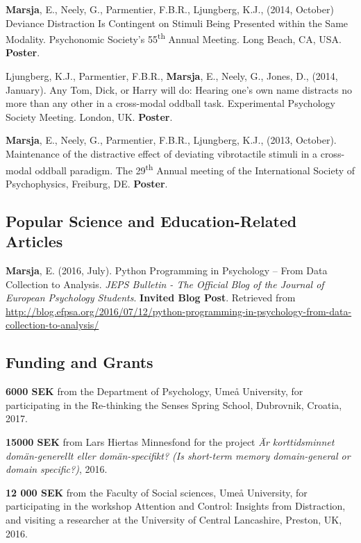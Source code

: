 \documentclass[]{article}
\begin{document}
\textbf{Marsja}, E., Neely, G., Parmentier, F.B.R., Ljungberg, K.J.,
(2014, October) Deviance Distraction Is Contingent on Stimuli Being
Presented within the Same Modality. Psychonomic Society's
55\textsuperscript{th} Annual Meeting. Long Beach, CA, USA.
\textbf{Poster}.

Ljungberg, K.J., Parmentier, F.B.R., \textbf{Marsja}, E., Neely, G.,
Jones, D., (2014, January). Any Tom, Dick, or Harry will do: Hearing
one's own name distracts no more than any other in a cross-modal oddball
task. Experimental Psychology Society Meeting. London, UK.
\textbf{Poster}.

\textbf{Marsja}, E., Neely, G., Parmentier, F.B.R., Ljungberg, K.J.,
(2013, October). Maintenance of the distractive effect of deviating
vibrotactile stimuli in a cross-modal oddball paradigm. The
29\textsuperscript{th} Annual meeting of the International Society of
Psychophysics, Freiburg, DE. \textbf{Poster}.

\subsection{Popular Science and Education-Related
Articles}\label{popular-science-and-education-related-articles}

\textbf{Marsja}, E. (2016, July). Python Programming in Psychology --
From Data Collection to Analysis. \emph{JEPS Bulletin - The Official
Blog of the Journal of European Psychology Students}. \textbf{Invited
Blog Post}. Retrieved from \sloppy
\url{http://blog.efpsa.org/2016/07/12/python-programming-in-psychology-from-data-collection-to-analysis/}

\subsection{Funding and Grants}\label{funding-and-grants}

\textbf{6000 SEK} from the Department of Psychology, Umeå University,
for participating in the Re-thinking the Senses Spring School,
Dubrovnik, Croatia, 2017.

\textbf{15000 SEK} from Lars Hiertas Minnesfond for the project \emph{Är
korttidsminnet domän-generellt eller domän-specifikt? (Is short-term
memory domain-general or domain specific?)}, 2016.

\textbf{12 000 SEK} from the Faculty of Social sciences, Umeå
University, for participating in the workshop Attention and Control:
Insights from Distraction, and visiting a researcher at the University
of Central Lancashire, Preston, UK, 2016.
\end{document}
